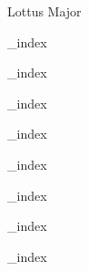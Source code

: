 \documentclass[a4paper,12pt]{article}
\begin{document}


\begin{center}

\huge{Lottus Major}

\end{center}



{_index}


{_index}


{_index}


{_index}


{_index}


{_index}


{_index}


{_index}
\end{document}

